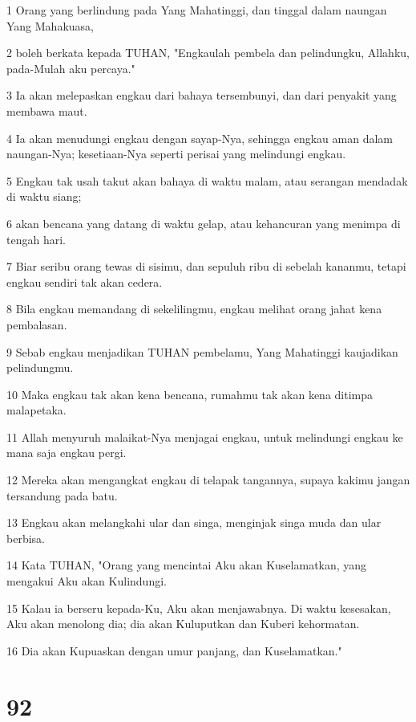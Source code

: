 \par 1 Orang yang berlindung pada Yang Mahatinggi, dan tinggal dalam naungan Yang Mahakuasa,
\par 2 boleh berkata kepada TUHAN, "Engkaulah pembela dan pelindungku, Allahku, pada-Mulah aku percaya."
\par 3 Ia akan melepaskan engkau dari bahaya tersembunyi, dan dari penyakit yang membawa maut.
\par 4 Ia akan menudungi engkau dengan sayap-Nya, sehingga engkau aman dalam naungan-Nya; kesetiaan-Nya seperti perisai yang melindungi engkau.
\par 5 Engkau tak usah takut akan bahaya di waktu malam, atau serangan mendadak di waktu siang;
\par 6 akan bencana yang datang di waktu gelap, atau kehancuran yang menimpa di tengah hari.
\par 7 Biar seribu orang tewas di sisimu, dan sepuluh ribu di sebelah kananmu, tetapi engkau sendiri tak akan cedera.
\par 8 Bila engkau memandang di sekelilingmu, engkau melihat orang jahat kena pembalasan.
\par 9 Sebab engkau menjadikan TUHAN pembelamu, Yang Mahatinggi kaujadikan pelindungmu.
\par 10 Maka engkau tak akan kena bencana, rumahmu tak akan kena ditimpa malapetaka.
\par 11 Allah menyuruh malaikat-Nya menjagai engkau, untuk melindungi engkau ke mana saja engkau pergi.
\par 12 Mereka akan mengangkat engkau di telapak tangannya, supaya kakimu jangan tersandung pada batu.
\par 13 Engkau akan melangkahi ular dan singa, menginjak singa muda dan ular berbisa.
\par 14 Kata TUHAN, "Orang yang mencintai Aku akan Kuselamatkan, yang mengakui Aku akan Kulindungi.
\par 15 Kalau ia berseru kepada-Ku, Aku akan menjawabnya. Di waktu kesesakan, Aku akan menolong dia; dia akan Kuluputkan dan Kuberi kehormatan.
\par 16 Dia akan Kupuaskan dengan umur panjang, dan Kuselamatkan."

\chapter{92}

